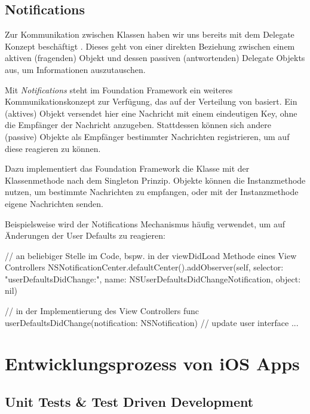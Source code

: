 \documentclass[parskip=half, final]{scrreprt}
\begin{document}
\section{Notifications}

Zur Kommunikation zwischen Klassen haben wir uns bereits mit dem Delegate Konzept beschäftigt . Dieses geht von einer direkten Beziehung zwischen einem aktiven (fragenden) Objekt und dessen passiven (antwortenden) Delegate Objekts aus, um Informationen auszutauschen.

Mit \emph{Notifications} steht im Foundation Framework ein weiteres Kommunikationskonzept zur Verfügung, das auf der Verteilung von  basiert. Ein (aktives) Objekt versendet hier eine Nachricht mit einem eindeutigen Key, ohne die Empfänger der Nachricht anzugeben. Stattdessen können sich andere (passive) Objekte als Empfänger bestimmter Nachrichten registrieren, um auf diese reagieren zu können.

Dazu implementiert das Foundation Framework die Klasse  mit der Klassenmethode  nach dem Singleton Prinzip. Objekte können die Instanzmethode  nutzen, um bestimmte Nachrichten zu empfangen, oder mit der Instanzmethode  eigene Nachrichten senden.

Beispielsweise wird der Notifications Mechanismus häufig verwendet, um auf Änderungen der User Defaults  zu reagieren:

\begin{swiftcode}
// an beliebiger Stelle im Code, bspw. in der viewDidLoad Methode eines View Controllers
NSNotificationCenter.defaultCenter().addObserver(self, selector: "userDefaultsDidChange:", name: NSUserDefaultsDidChangeNotification, object: nil)

// in der Implementierung des View Controllers
func userDefaultsDidChange(notification: NSNotification) {
    // update user interface ...
}
\end{swiftcode}



\chapter{Entwicklungsprozess von iOS Apps}


\section{Unit Tests \& Test Driven Development}
\end{document}
